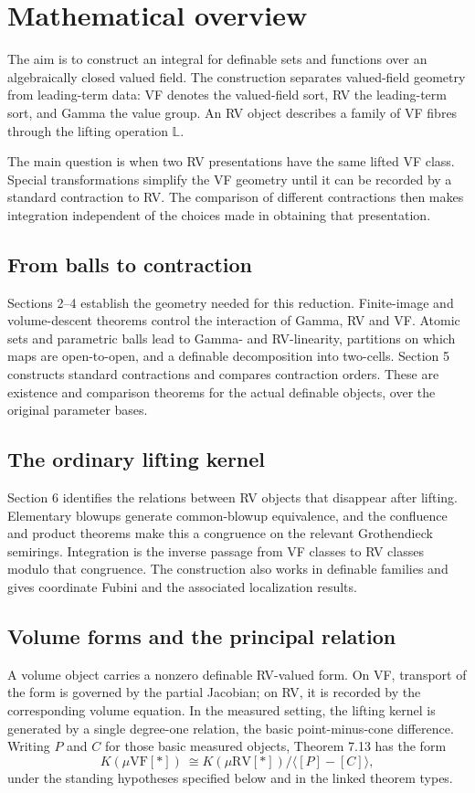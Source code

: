 \section{Mathematical overview}

The aim is to construct an integral for definable sets and functions over an
algebraically closed valued field. The construction separates valued-field
geometry from leading-term data: VF denotes the valued-field sort, RV the
leading-term sort, and Gamma the value group. An RV object describes a family
of VF fibres through the lifting operation $\mathbb L$.

The main question is when two RV presentations have the same lifted VF class.
Special transformations simplify the VF geometry until it can be recorded by
a standard contraction to RV. The comparison of different contractions then
makes integration independent of the choices made in obtaining that presentation.

\subsection{From balls to contraction}
Sections 2--4 establish the geometry needed for this reduction. Finite-image
and volume-descent theorems control the interaction of Gamma, RV and VF.
Atomic sets and parametric balls lead to Gamma- and RV-linearity, partitions
on which maps are open-to-open, and a definable decomposition into two-cells.
Section 5 constructs standard contractions and compares contraction orders.
These are existence and comparison theorems for the actual definable objects,
over the original parameter bases.

\subsection{The ordinary lifting kernel}
Section 6 identifies the relations between RV objects that disappear after
lifting. Elementary blowups generate common-blowup equivalence, and the
confluence and product theorems make this a congruence on the relevant
Grothendieck semirings. Integration is the inverse passage from VF classes
to RV classes modulo that congruence. The construction also works in definable
families and gives coordinate Fubini and the associated localization results.

\subsection{Volume forms and the principal relation}
A volume object carries a nonzero definable RV-valued form. On VF, transport
of the form is governed by the partial Jacobian; on RV, it is recorded by the
corresponding volume equation. In the measured setting, the lifting kernel is
generated by a single degree-one relation, the basic point-minus-cone difference.
Writing $P$ and $C$ for those basic measured objects, Theorem 7.13 has the form
\[
 K(\mu\mathrm{VF}[*])\ \cong
 K(\mu\mathrm{RV}[*])\big/\langle[P]-[C]\rangle,
\]
under the standing hypotheses specified below and in the linked theorem types.

